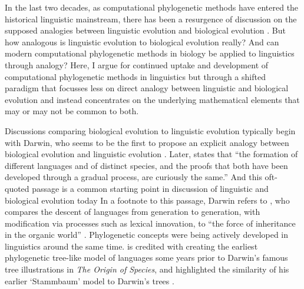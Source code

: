In the last two decades, as computational phylogenetic methods have entered the historical linguistic mainstream, there has been a resurgence of discussion on the supposed analogies between linguistic evolution and biological evolution \autocite[e.g.][]{atkinson_curious_2005}. But how analogous is linguistic evolution to biological evolution really? And can modern computational phylogenetic methods in biology be applied to linguistics through analogy? Here, I argue for continued uptake and development of computational phylogenetic methods in linguistics but through a shifted paradigm that focusses less on direct analogy between linguistic and biological evolution and instead concentrates on the underlying mathematical elements that may or may not be common to both.

Discussions comparing biological evolution to linguistic evolution typically begin with Darwin, who seems to be the first to propose an explicit analogy between biological evolution and linguistic evolution \autocite[p.~422]{darwin_origin_1859}. Later, \textcite[p.~57]{darwin_descent_1871} states that ``the formation of different languages and of distinct species, and the proofs that both have been developed through a gradual process, are curiously the same.'' And this oft-quoted passage is a common starting point in discussion of linguistic and biological evolution today \autocites[e.g.][]{atkinson_curious_2005}{bromham_curiously_2017}{mesoudi_pursuing_2017} In a footnote to this passage, Darwin refers to \textcite[ch.~13]{lyell_geological_1863}, who compares the descent of languages from generation to generation, with modification via processes such as lexical innovation, to ``the force of inheritance in the organic world'' \autocite[p.~457]{lyell_geological_1863}. Phylogenetic concepts were being actively developed in linguistics around the same time. \textcite{schleicher_ersten_1853} is credited with creating the earliest phylogenetic tree-like model of languages some years prior to Darwin's famous tree illustrations in \emph{The Origin of Species}, and highlighted the similarity of his earlier `Stammbaum' model to Darwin's trees \autocite{schleicher_darwinsche_1863}.

